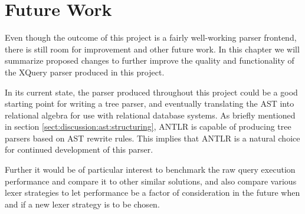 \chapter{Future Work}
\label{sect:summary:future_work}
\label{chapter:future}
\label{sect:future:improvements}

Even though the outcome of this project is a fairly well-working parser
frontend, there is still room for improvement and other future work. In this
chapter we will summarize proposed changes to further improve the quality and
functionality of the XQuery parser produced in this project.

In its current state, the parser produced throughout this project could be a good
starting point for writing a tree parser, and eventually translating the AST
into relational algebra for use with relational database systems. As briefly
mentioned in section \ref{sect:discussion:ast:structuring}, ANTLR is capable of
producing tree parsers based on AST rewrite rules. This implies that ANTLR is a
natural choice for continued development of this parser.

Further it would be of particular interest to benchmark the raw query execution
performance and compare it to other similar solutions, and also compare various
lexer strategies to let performance be a factor of consideration in the future
when and if a new lexer strategy is to be chosen.


